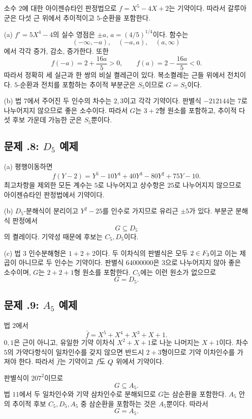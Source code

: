 \begin{solution}
소수 $2$에 대한 아이젠슈타인 판정법으로 $f=X^5-4X+2$는 기약이다. 따라서 갈루아군은 다섯 근 위에서 추이적이고 $5$-순환을 포함한다.

(a) $f'=5X^4-4$의 실수 영점은 $\pm a$, $a=(4/5)^{1/4}$이다. 함수는
\[
  (-\infty,-a),\quad(-a,a),\quad(a,\infty)
\]
에서 각각 증가, 감소, 증가한다. 또한
\[
  f(-a)=2+\frac{16a}{5}>0,
  \qquad
  f(a)=2-\frac{16a}{5}<0.
\]
따라서 정확히 세 실근과 한 쌍의 비실 켤레근이 있다. 복소켤레는 근들 위에서 전치이다. $5$-순환과 전치를 포함하는 추이적 부분군은 $S_5$이므로 $G=S_5$이다.

(b) 법 $7$에서 주어진 두 인수의 차수는 $2,3$이고 각각 기약이다. 판별식 $-212144$는 $7$로 나누어지지 않으므로 좋은 소수이다. 따라서 $G$는 $3+2$형 원소를 포함하고, 추이적 다섯 후보 가운데 가능한 군은 $S_5$뿐이다.
\end{solution}

\subsection*{문제 \thechapter.8: $D_5$ 예제}

\begin{solution}
(a) 평행이동하면
\[
  f(Y-2)=Y^5-10Y^4+40Y^3-80Y^2+75Y-10.
\]
최고차항을 제외한 모든 계수는 $5$로 나누어지고 상수항은 $25$로 나누어지지 않으므로 아이젠슈타인 판정법에서 기약이다.

(b) $D_5$-분해식이 분리이고 $Y^2-25$를 인수로 가지므로 유리근 $\pm5$가 있다. 부분군 분해식 판정에서
\[
  G\subseteq D_5
\]
의 켤레이다. 기약성 때문에 후보는 $C_5,D_5$이다.

(c) 법 $3$ 인수분해형은 $1+2+2$이다. 두 이차식의 판별식은 모두 $2\in F_3$이고 이는 제곱이 아니므로 두 인수는 기약이다. 판별식 $64000000$은 $3$으로 나누어지지 않아 좋은 소수이며, $G$는 $2+2+1$형 원소를 포함한다. $C_5$에는 이런 원소가 없으므로
\[
  G=D_5.
\]
\end{solution}

\subsection*{문제 \thechapter.9: $A_5$ 예제}

\begin{solution}
법 $2$에서
\[
  \bar f=X^5+X^4+X^3+X+1.
\]
$0,1$은 근이 아니고, 유일한 기약 이차식 $X^2+X+1$로 나눈 나머지는 $X+1$이다. 차수 $5$의 가약다항식이 일차인수를 갖지 않으면 반드시 $2+3$형이므로 기약 이차인수를 가져야 한다. 따라서 $\bar f$는 기약이고 $f$도 $Q$ 위에서 기약이다.

판별식이 $207^2$이므로
\[
  G\subseteq A_5.
\]
법 $11$에서 두 일차인수와 기약 삼차인수로 분해되므로 $G$는 삼순환을 포함한다. $A_5$ 안의 추이적 후보 $C_5,D_5,A_5$ 중 삼순환을 포함하는 것은 $A_5$뿐이다. 따라서
\[
  G=A_5.
\]
\end{solution}

